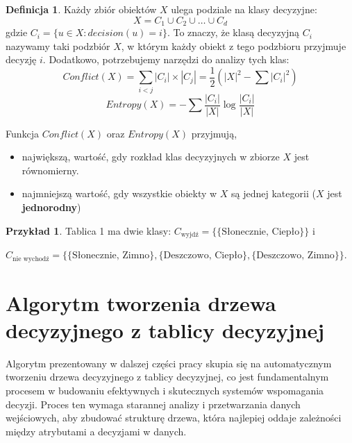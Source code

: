 \documentclass[12pt]{article}
\theoremstyle{definition}
\newtheorem{definition}{Definicja}[section]
\theoremstyle{definition}
\newtheorem{example}{Przykład}[section]
\begin{document}
\begin{definition}
    Każdy zbiór obiektów $X$ ulega podziale na klasy decyzyjne:
    \[
    X = C_1 \cup C_2 \cup \ldots \cup C_d
    \]
    gdzie $C_i = \{u \in X: decision(u) = i\}$. To znaczy, że klasą decyzyjną $C_i$ nazywamy taki podzbiór $X$, w którym każdy obiekt z tego podzbioru przyjmuje decyzję $i$. Dodatkowo, potrzebujemy narzędzi do analizy tych klas:
    \[
    Conflict(X)=\sum_{i < j}|C_i|\times|C_j|=\frac{1}{2}\left(|X|^2-\sum|C_i|^2\right)
    \]
    \[
    Entropy(X) = -\sum\frac{|C_i|}{|X|}\log{\frac{|C_i|}{|X|}}
    \]

    Funkcja $Conflict(X)$ oraz $Entropy(X)$ przyjmują,
    \begin{itemize}
        \item największą, wartość, gdy rozkład klas decyzyjnych w
zbiorze $X$ jest równomierny.
        \item najmniejszą wartość, gdy wszystkie obiekty w $X$ są
jednej kategorii ($X$ jest \textbf{jednorodny})
    \end{itemize}
\end{definition}



\begin{example}
    Tablica 1 ma dwie klasy: $C_{\textrm{wyjdź}}=\{\{\textrm{Słonecznie, Ciepło}\}\}$ i 

$C_{\textrm{nie wychodź}}=\{\{\textrm{Słonecznie, Zimno}\},\{\textrm{Deszczowo, Ciepło}\},\{\textrm{Deszczowo, Zimno}\}\}$.
\end{example}


\section{Algorytm tworzenia drzewa decyzyjnego z tablicy decyzyjnej}

Algorytm prezentowany w dalszej części pracy skupia się na automatycznym tworzeniu drzewa decyzyjnego z tablicy decyzyjnej, co jest fundamentalnym procesem w budowaniu efektywnych i skutecznych systemów wspomagania decyzji. Proces ten wymaga starannej analizy i przetwarzania danych wejściowych, aby zbudować strukturę drzewa, która najlepiej oddaje zależności między atrybutami a decyzjami w danych.
\end{document}
